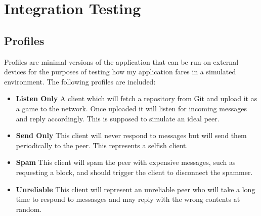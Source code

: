 \section{Integration Testing}

\subsection*{Profiles}

Profiles are minimal versions of the application that can be run on external devices for the purposes of testing how my application fares in a simulated environment. The following profiles are included:

\begin{itemize}
  \item \textbf{Listen Only} A client which will fetch a repository from Git and upload it as a game to the network. Once uploaded it will listen for incoming messages and reply accordingly. This is supposed to simulate an ideal peer.
  \item \textbf{Send Only} This client will never respond to messages but will send them periodically to the peer. This represents a selfish client.
  \item \textbf{Spam} This client will spam the peer with expensive messages, such as requesting a block, and should trigger the client to disconnect the spammer.
  \item \textbf{Unreliable} This client will represent an unreliable peer who will take a long time to respond to messasges and may reply with the wrong contents at random. 
\end{itemize}